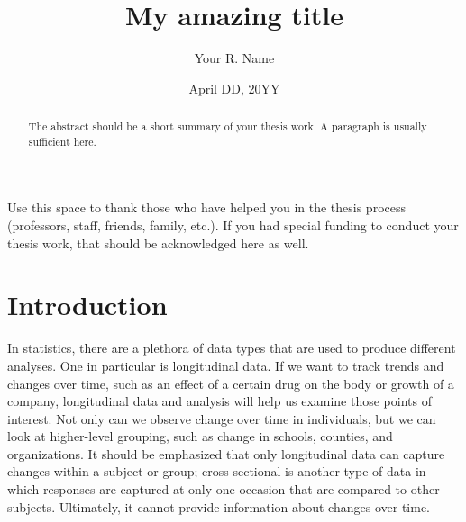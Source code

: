 \documentclass[12pt, twoside]{amherstthesis}
\title{My amazing title}
\author{Your R. Name}
\date{April DD, 20YY}
\theoremstyle{definition}
\theoremstyle{definition}
\theoremstyle{definition}
\theoremstyle{remark}
\begin{document}
\doublespace
  \maketitle

\frontmatter %
\pagestyle{fancyplain}

  \begin{abstract}
    The abstract should be a short summary of your thesis work. A paragraph is usually sufficient here.
  \end{abstract}
  \begin{acknowledgments}
    Use this space to thank those who have helped you in the thesis process (professors, staff, friends, family, etc.). If you had special funding to conduct your thesis work, that should be acknowledged here as well.
  \end{acknowledgments}

  \hypersetup{linkcolor=black}
  \setcounter{tocdepth}{2}
  \tableofcontents

  \listoftables

  \listoffigures


\mainmatter %
\pagestyle{fancyplain} %

\hypertarget{intro}{%
\chapter{Introduction}\label{intro}}

In statistics, there are a plethora of data types that are used to produce different analyses. One in particular is longitudinal data. If we want to track trends and changes over time, such as an effect of a certain drug on the body or growth of a company, longitudinal data and analysis will help us examine those points of interest. Not only can we observe change over time in individuals, but we can look at higher-level grouping, such as change in schools, counties, and organizations. It should be emphasized that only longitudinal data can capture changes within a subject or group; cross-sectional is another type of data in which responses are captured at only one occasion that are compared to other subjects. Ultimately, it cannot provide information about changes over time.
\end{document}
